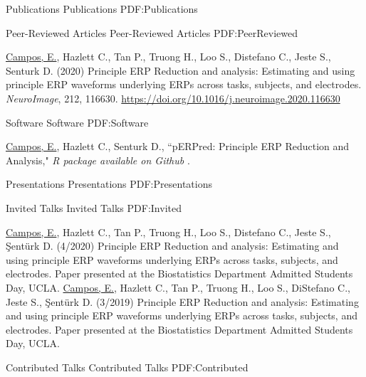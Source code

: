 \documentclass[letterpaper,MMMyyyy,nonstopmode]{simpleresumecv}
\begin{document}
\begin{Body}

\Section
{Publications}
{Publications}
{PDF:Publications}

\SubSection
{Peer-Reviewed Articles}
{Peer-Reviewed Articles}
{PDF:PeerReviewed}

\begingroup
\renewcommand{\MaxNumberedItem}{[88]}

\BigGap
\BulletItem
\underline{Campos, E.}, Hazlett C., Tan P., Truong H., Loo S., Distefano C., Jeste S., Senturk D. (2020) Principle ERP Reduction and analysis: Estimating and using principle ERP waveforms underlying ERPs across tasks, subjects, and electrodes. \textit{NeuroImage}, 212, 116630. \href{https://doi.org/10.1016/j.neuroimage.2020.116630}{\url{https://doi.org/10.1016/j.neuroimage.2020.116630}}

\endgroup

\BigGap
\SubSection
{Software}
{Software}
{PDF:Software}

\begingroup
\renewcommand{\MaxNumberedItem}{[8888]}

\BigGap
\BulletItem
\underline{Campos, E.}, Hazlett C., Senturk D., ``pERPred:  Principle ERP Reduction and Analysis," \textit{R package available on Github} .


\endgroup


\Section
{Presentations}
{Presentations}
{PDF:Presentations}

\SubSection
{Invited Talks}
{Invited Talks}
{PDF:Invited}


\BigGap
\BulletItem 
\underline{Campos, E.}, Hazlett C., Tan P., Truong H., Loo S., Distefano C., Jeste S., \c{S}ent\"{u}rk D. (4/2020) Principle ERP Reduction and analysis: Estimating and using principle ERP waveforms underlying ERPs across tasks, subjects, and electrodes. Paper presented at the Biostatistics Department Admitted Students Day, UCLA.
\BigGap
\BulletItem
\underline{Campos, E.}, Hazlett C., Tan P., Truong H., Loo S., DiStefano C., Jeste S., \c{S}ent\"{u}rk D. (3/2019) Principle ERP Reduction and analysis: Estimating and using principle ERP waveforms underlying ERPs across tasks, subjects, and electrodes. Paper presented at the Biostatistics Department Admitted Students Day, UCLA.

\BigGap
\SubSection
{Contributed Talks}
{Contributed Talks}
{PDF:Contributed}


\end{Body}
\end{document}
